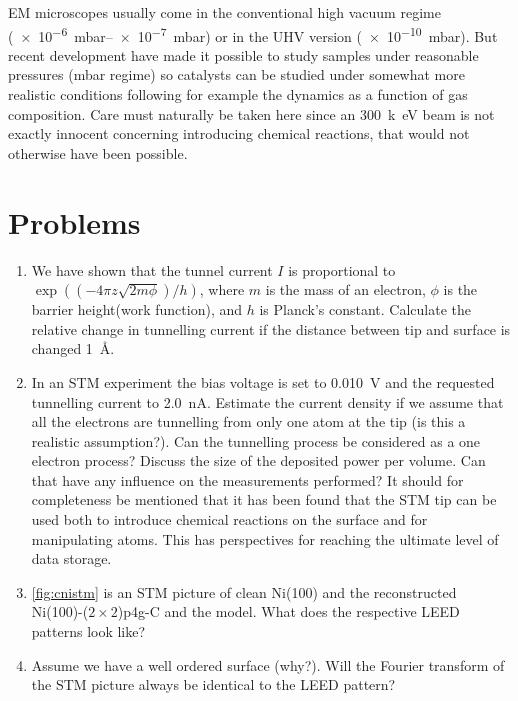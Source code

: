 EM microscopes usually come in the conventional high vacuum regime (\SIrange{e-6}{e-7}{mbar}) or in the UHV version (\SI{e-10}{mbar}). But  recent development have made it possible to study samples under reasonable pressures (mbar regime) so catalysts can be studied under somewhat more realistic conditions following for example the dynamics as a function of gas composition. Care must naturally be taken here since an \SI{300}{k\electronvolt} beam is not exactly innocent concerning introducing chemical reactions, that would not otherwise have been possible.

\section{Problems}
\begin{enumerate}
\item We have shown that the tunnel current $I$ is proportional to $\exp((-4\pi z\sqrt{2m\phi})/h)$, where $m$ is the mass of an electron, $\phi$ is the barrier height(work function), and $h$ is Planck's constant. Calculate the relative change in tunnelling current if the distance between tip and surface is changed \SI{1}{\angstrom}.

\item In an STM experiment the bias voltage is set to \SI{0.010}{V} and the requested tunnelling current to \SI{2.0}{nA}. Estimate the current density if we assume that all the electrons are tunnelling from only one atom at the tip (is this a realistic assumption?). Can the tunnelling process be considered as a one electron process? Discuss the size of the deposited power per volume. Can that have any influence on the measurements performed? It should for completeness be mentioned that it has been found that the STM tip can be used both to introduce chemical reactions on the surface and for manipulating atoms. This has perspectives for reaching the ultimate level of data storage.

\item \autoref{fig:cnistm} is an STM picture of clean Ni(100) and the reconstructed Ni(100)-($2\times 2$)p4g-C and the model. What does the respective LEED patterns look like?

\item Assume we have a well ordered surface (why?). Will the Fourier transform of the STM picture always be identical to the LEED pattern?
\end{enumerate}